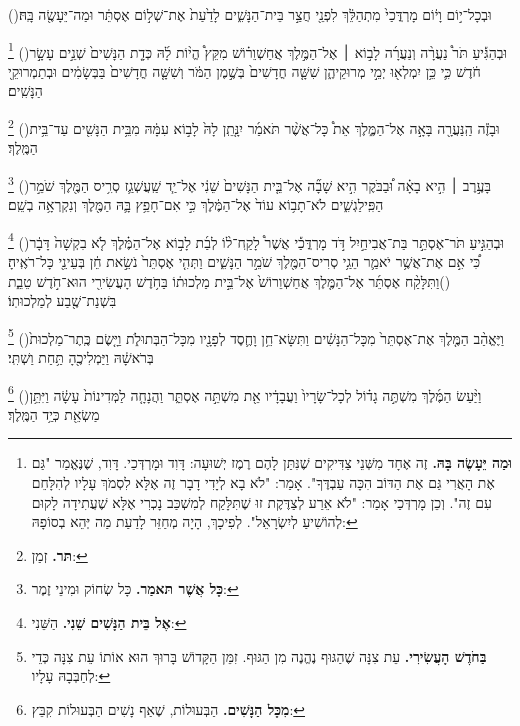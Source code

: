 \documentclass[12pt, openany]{book}
\newcommand{\footnotecomment}[1]{
	\renewcommand\thefootnote{}
	\footnote{\textsf{#1}}}
\newcommand{\commenta}[1]{\footnotecomment{#1}\hspace{0em}}
\newcommand{\vsnum}[1]{(\hebrewnumeral{#1})\space}
\begin{document}
\begin{multicols}{2}
\vsnum{11}וּבְכָל־י֣וֹם וָי֔וֹם מָרְדֳּכַי֙ מִתְהַלֵּ֔ךְ לִפְנֵ֖י חֲצַ֣ר בֵּית־הַנָּשִׁ֑ים לָדַ֙עַת֙ אֶת־שְׁל֣וֹם אֶסְתֵּ֔ר וּמַה־יֵּעָשֶׂ֖ה בָּֽהּ׃%
\commenta{\textrm{\textbf{וּמַה יֵּעָשֶׂה בָּהּ.}} זֶה אֶחָד מִשְּׁנֵי צַדִּיקִים שֶׁנִּתַּן לָהֶם רֶמֶז יְשׁוּעָה: דָּוִד וּמָרְדְּכַי. דָּוִד, שֶׁנֶּאֱמַר "גַּם אֶת הָאֲרִי גַּם אֶת הַדּוֹב הִכָּה עַבְדֶּךָ". אָמַר: "לֹא בָא לְיָדִי דָבָר זֶה אֶלָּא לִסְמֹךְ עָלָיו לְהִלָּחֵם עִם זֶה". וְכֵן מָרְדְּכַי אָמַר: "לֹא אֵרַע לְצַדֶּקֶת זוּ שֶׁתִּלָּקַח לְמִשְׁכַּב נָכְרִי אֶלָּא שֶׁעֲתִידָה לָקוּם לְהוֹשִׁיעַ לְיִשְׂרָאֵל". לְפִיכָךְ, הָיָה מְחַזֵּר לָדַעַת מַה יְּהֵא בְסוֹפָהּ: }%
\vsnum{12}וּבְהַגִּ֡יעַ תֹּר֩ נַעֲרָ֨ה וְנַעֲרָ֜ה לָב֣וֹא ׀ אֶל־הַמֶּ֣לֶךְ אֲחַשְׁוֵר֗וֹשׁ מִקֵּץ֩ הֱי֨וֹת לָ֜הּ כְּדָ֤ת הַנָּשִׁים֙ שְׁנֵ֣ים עָשָׂ֣ר חֹ֔דֶשׁ כִּ֛י כֵּ֥ן יִמְלְא֖וּ יְמֵ֣י מְרוּקֵיהֶ֑ן שִׁשָּׁ֤ה חֳדָשִׁים֙ בְּשֶׁ֣מֶן הַמֹּ֔ר וְשִׁשָּׁ֤ה חֳדָשִׁים֙ בַּבְּשָׂמִ֔ים וּבְתַמְרוּקֵ֖י הַנָּשִֽׁים׃%
\commenta{\textrm{\textbf{תּר.}} זְמַן:}%
\vsnum{13}וּבָזֶ֕ה הַֽנַּעֲרָ֖ה בָּאָ֣ה אֶל־הַמֶּ֑לֶךְ אֵת֩ כָּל־אֲשֶׁ֨ר תֹּאמַ֜ר יִנָּ֤תֵֽן לָהּ֙ לָב֣וֹא עִמָּ֔הּ מִבֵּ֥ית הַנָּשִׁ֖ים עַד־בֵּ֥ית הַמֶּֽלֶךְ׃%
\commenta{\textrm{\textbf{כָּל אֲשֶׁר תּאמַר.}} כָּל שְׂחוֹק וּמִינֵי זֶמֶר:}%
\vsnum{14}בָּעֶ֣רֶב ׀ הִ֣יא בָאָ֗ה וּ֠בַבֹּקֶר הִ֣יא שָׁבָ֞ה אֶל־בֵּ֤ית הַנָּשִׁים֙ שֵׁנִ֔י אֶל־יַ֧ד שַֽׁעֲשְׁגַ֛ז סְרִ֥יס הַמֶּ֖לֶךְ שֹׁמֵ֣ר הַפִּֽילַגְשִׁ֑ים לֹא־תָב֥וֹא עוֹד֙ אֶל־הַמֶּ֔לֶךְ כִּ֣י אִם־חָפֵ֥ץ בָּ֛הּ הַמֶּ֖לֶךְ וְנִקְרְאָ֥ה בְשֵֽׁם׃%
\commenta{\textrm{\textbf{אֶל בֵּית הַנָּשִׁים שֵׁנִי.}} הַשֵּׁנִי:}%
\vsnum{15}וּבְהַגִּ֣יעַ תֹּר־אֶסְתֵּ֣ר בַּת־אֲבִיחַ֣יִל דֹּ֣ד מָרְדֳּכַ֡י אֲשֶׁר֩ לָקַֽח־ל֨וֹ לְבַ֜ת לָב֣וֹא אֶל־הַמֶּ֗לֶךְ לֹ֤א בִקְשָׁה֙ דָּבָ֔ר כִּ֠י אִ֣ם אֶת־אֲשֶׁ֥ר יֹאמַ֛ר הֵגַ֥י סְרִיס־הַמֶּ֖לֶךְ שֹׁמֵ֣ר הַנָּשִׁ֑ים וַתְּהִ֤י אֶסְתֵּר֙ נֹשֵׂ֣את חֵ֔ן בְּעֵינֵ֖י כָּל־רֹאֶֽיהָ׃
\vsnum{16}וַתִּלָּקַ֨ח אֶסְתֵּ֜ר אֶל־הַמֶּ֤לֶךְ אֲחַשְׁוֵרוֹשׁ֙ אֶל־בֵּ֣ית מַלְכוּת֔וֹ בַּחֹ֥דֶשׁ הָעֲשִׂירִ֖י הוּא־חֹ֣דֶשׁ טֵבֵ֑ת בִּשְׁנַת־שֶׁ֖בַע לְמַלְכוּתֽוֹ׃%
\commenta{\textrm{\textbf{בַּחֹדֶשׁ הָעֲשִׂירִי.}} עֵת צִנָּה שֶׁהַגּוּף נֶהֱנֶה מִן הַגּוּף. זִמֵּן הַקָּדוֹשׁ בָּרוּךְ הוּא אוֹתוֹ עֵת צִנָּה כְּדֵי לְחַבְּבָהּ עָלָיו:}%
\vsnum{17}וַיֶּאֱהַ֨ב הַמֶּ֤לֶךְ אֶת־אֶסְתֵּר֙ מִכָּל־הַנָּשִׁ֔ים וַתִּשָּׂא־חֵ֥ן וָחֶ֛סֶד לְפָנָ֖יו מִכָּל־הַבְּתוּלֹ֑ת וַיָּ֤שֶׂם כֶּֽתֶר־מַלְכוּת֙ בְּרֹאשָׁ֔הּ וַיַּמְלִיכֶ֖הָ תַּ֥חַת וַשְׁתִּֽי׃%
\commenta{\textrm{\textbf{מִכָּל הַנָּשִׁים.}} הַבְּעוּלוֹת, שֶׁאַף נָשִׁים הַבְּעוּלוֹת קִבֵּץ: }%
\vsnum{18}וַיַּ֨עַשׂ הַמֶּ֜לֶךְ מִשְׁתֶּ֣ה גָד֗וֹל לְכָל־שָׂרָיו֙ וַעֲבָדָ֔יו אֵ֖ת מִשְׁתֵּ֣ה אֶסְתֵּ֑ר וַהֲנָחָ֤ה לַמְּדִינוֹת֙ עָשָׂ֔ה וַיִּתֵּ֥ן מַשְׂאֵ֖ת כְּיַ֥ד הַמֶּֽלֶךְ׃%

\end{multicols}
\end{document}
